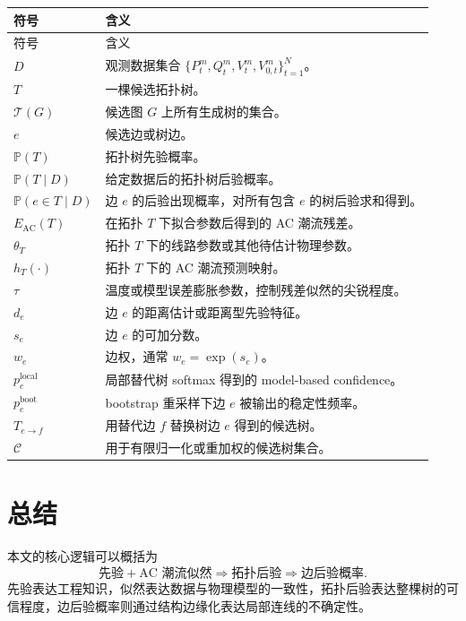 \documentclass[UTF8,12pt,openany]{ctexrep}
\numberwithin{equation}{chapter}
\theoremstyle{definition}
\theoremstyle{plain}
\newcommand{\Prob}{\mathbb{P}}
\newcommand{\Tcal}{\mathcal{T}}
\newcommand{\Ccal}{\mathcal{C}}
\newcommand{\Eac}{E_{\mathrm{AC}}}
\begin{document}
\begin{longtable}{>{\raggedright\arraybackslash}p{}>{\raggedright\arraybackslash}p{}}
\toprule
符号 & 含义 \\
\midrule
\endfirsthead
\toprule
符号 & 含义 \\
\midrule
\endhead
$D$ & 观测数据集合 $\{P_t^m,Q_t^m,V_t^m,V_{0,t}^m\}_{t=1}^{N}$。\\
$T$ & 一棵候选拓扑树。\\
$\Tcal(G)$ & 候选图 $G$ 上所有生成树的集合。\\
$e$ & 候选边或树边。\\
$\Prob(T)$ & 拓扑树先验概率。\\
$\Prob(T\mid D)$ & 给定数据后的拓扑树后验概率。\\
$\Prob(e\in T\mid D)$ & 边 $e$ 的后验出现概率，对所有包含 $e$ 的树后验求和得到。\\
$\Eac(T)$ & 在拓扑 $T$ 下拟合参数后得到的 AC 潮流残差。\\
$\theta_T$ & 拓扑 $T$ 下的线路参数或其他待估计物理参数。\\
$h_T(\cdot)$ & 拓扑 $T$ 下的 AC 潮流预测映射。\\
$\tau$ & 温度或模型误差膨胀参数，控制残差似然的尖锐程度。\\
$d_e$ & 边 $e$ 的距离估计或距离型先验特征。\\
$s_e$ & 边 $e$ 的可加分数。\\
$w_e$ & 边权，通常 $w_e=\exp(s_e)$。\\
$p_e^{\mathrm{local}}$ & 局部替代树 softmax 得到的 model-based confidence。\\
$p_e^{\mathrm{boot}}$ & bootstrap 重采样下边 $e$ 被输出的稳定性频率。\\
$T_{e\to f}$ & 用替代边 $f$ 替换树边 $e$ 得到的候选树。\\
$\Ccal$ & 用于有限归一化或重加权的候选树集合。\\
\bottomrule
\end{longtable}

\chapter{总结}

本文的核心逻辑可以概括为
\begin{equation}
\text{先验}
+
\text{AC 潮流似然}
\Rightarrow
\text{拓扑后验}
\Rightarrow
\text{边后验概率}.
\label{eq:summary-chain}
\end{equation}
先验表达工程知识，似然表达数据与物理模型的一致性，拓扑后验表达整棵树的可信程度，边后验概率则通过结构边缘化表达局部连线的不确定性。
\end{document}
